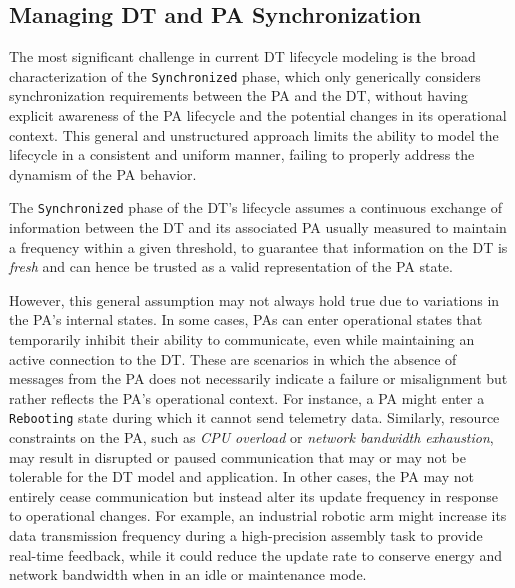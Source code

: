 \subsection{Managing DT and PA Synchronization}


The most significant challenge in current \ac{DT} lifecycle modeling is the broad characterization of the \texttt{Synchronized} phase, which
only generically considers synchronization requirements between the \ac{PA} and the \ac{DT}, without having explicit awareness of the \ac{PA} lifecycle and the potential changes in its operational context.
This general and unstructured approach limits the ability to model the lifecycle in a consistent and uniform manner, failing to properly address the dynamism of the \ac{PA} behavior.

The \texttt{Synchronized} phase of the \ac{DT}'s lifecycle assumes a continuous exchange of information between the \ac{DT} and its associated \ac{PA} usually measured to maintain a frequency within a given threshold, to guarantee that information on the \ac{DT} is \emph{fresh} and can hence be trusted as a valid representation of the \ac{PA} state. 

However, this general assumption may not always hold true due to variations in the \ac{PA}'s internal states.
%
In some cases, \acp{PA} can enter operational states that temporarily inhibit their ability to communicate, even while maintaining an active connection to the \ac{DT}.
These are scenarios in which the absence of messages from the \ac{PA} does not necessarily indicate a failure or misalignment but rather reflects the \ac{PA}'s operational context.
For instance, a \ac{PA} might enter a \texttt{Rebooting} state during which it cannot send telemetry data.
Similarly, resource constraints on the \ac{PA}, such as \textit{CPU overload} or \textit{network bandwidth exhaustion}, may result in disrupted or paused communication that may or may not be tolerable for the \ac{DT} model and application.
%
In other cases, the \ac{PA} may not entirely cease communication but instead alter its update frequency in response to operational changes. For example, an industrial robotic arm might increase its data transmission frequency during a high-precision assembly task to provide real-time feedback, while it could reduce the update rate to conserve energy and network bandwidth when in an idle or maintenance mode.


